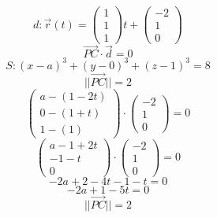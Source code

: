 \documentclass{article}
\begin{document}
\[
d: \vec{r}(t) = \begin{pmatrix} 1 \\ 1 \\ 1 \end{pmatrix}t + \begin{pmatrix} -2 \\ 1 \\ 0 \end{pmatrix}
\]
\[
\vec{PC} \cdot \vec{d} = 0
\]
\[
S: (x-a)^3 + (y-0)^3 + (z-1)^3 = 8
\]
\[
||\vec{PC}|| = 2
\]
\[
\begin{pmatrix} a-(1-2t) \\ 0-(1+t) \\ 1-(1) \end{pmatrix} \cdot \begin{pmatrix} -2 \\ 1 \\ 0 \end{pmatrix} = 0
\]
\[
\begin{pmatrix} a-1+2t \\ -1-t \\ 0 \end{pmatrix} \cdot \begin{pmatrix} -2 \\ 1 \\ 0 \end{pmatrix} = 0
\]
\[
-2a+2-4t-1-t = 0
\]
\[
-2a+1-5t = 0
\]
\[
||\vec{PC}|| = 2
\]
\end{document}
